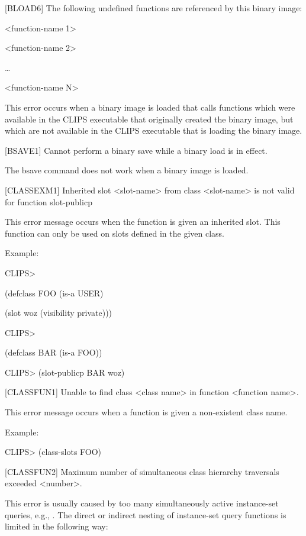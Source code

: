 \documentclass[letterpaper,10pt,english]{sphinxmanual}
\begin{document}
\begin{DUlineblock}{0em}
\item[] {[}BLOAD6{]} The following undefined functions are referenced by this
binary image:
\item[] \textless{}function-name 1\textgreater{}
\item[] \textless{}function-name 2\textgreater{}
\item[] …
\item[] \textless{}function-name N\textgreater{}
\end{DUlineblock}

This error occurs when a binary image is loaded that calls functions
which were available in the CLIPS executable that originally created the
binary image, but which are not available in the CLIPS executable that
is loading the binary image.

{[}BSAVE1{]} Cannot perform a binary save while a binary load is in effect.

The bsave command does not work when a binary image is loaded.

{[}CLASSEXM1{]} Inherited slot \textless{}slot-name\textgreater{} from class \textless{}slot-name\textgreater{} is not
valid for function slot-publicp

This error message occurs when the function  is given an
inherited slot. This function can only be used on slots defined in the
given class.

Example:

CLIPS\textgreater{}

(defclass FOO (is-a USER)

(slot woz (visibility private)))

CLIPS\textgreater{}

(defclass BAR (is-a FOO))

CLIPS\textgreater{} (slot-publicp BAR woz)

{[}CLASSFUN1{]} Unable to find class \textless{}class name\textgreater{} in function \textless{}function
name\textgreater{}.

This error message occurs when a function is given a non-existent class
name.

Example:

CLIPS\textgreater{} (class-slots FOO)

{[}CLASSFUN2{]} Maximum number of simultaneous class hierarchy traversals
exceeded \textless{}number\textgreater{}.

This error is usually caused by too many simultaneously active
instance-set queries, e.g., . The direct or
indirect nesting of instance-set query functions is limited in the
following way:
\end{document}
